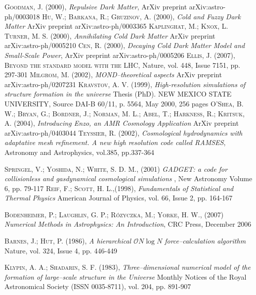 \documentclass[a4paper,openright,12pt]{book}
\begin{document}
\begin{thebibliography}{a}
 
 \textsc{Goodman, J. (2000)},
\textit{Repulsive Dark Matter},
ArXiv preprint arXiv:astro-ph/0003018
 \textsc{Hu, W.; Barkana, R.; Gruzinov, A. (2000)},
\textit{Cold and Fuzzy Dark Matter}
ArXiv preprint arXiv:astro-ph/0003365
 \textsc{Kaplinghat, M.; Knox, L. Turner, M. S. (2000)},
\textit{Annihilating Cold Dark Matter}
ArXiv preprint arXiv:astro-ph/0005210
 \textsc{Cen, R. (2000)},
\textit{Decaying Cold Dark Matter Model and Small-Scale Power},
ArXiv preprint arXiv:astro-ph/0005206
 \textsc{Ellis, J. (2007)},
\textsc{Beyond the standard model with the LHC},
Nature, vol. 448, Issue 7151, pp. 297-301
 \textsc{Milgrom, M. (2002)},
\textit{MOND--theoretical aspects}
ArXiv preprint arXiv:astro-ph/0207231
 \textsc{Kravstov, A. V. (1999)},
\textit{High-resolution simulations of structure formation in the universe}
Thesis (PhD). NEW MEXICO STATE UNIVERSITY, Source DAI-B 60/11, p. 5564, May 2000, 256 pages
 \textsc{O'Shea, B. W.; Bryan, G.; Bordner, J.; Norman, M. L.; Abel, T.; Harkness, R.; Kritsuk, A. (2004)},
\textit{Introducing Enzo, an AMR Cosmology Application}
ArXiv preprint arXiv:astro-ph/0403044
 \textsc{Teyssier, R. (2002)},
\textit{Cosmological hydrodynamics with adaptative mesh refinement. A new high resolution code called RAMSES},
Astronomy and Astrophysics, vol.385, pp.337-364

 \textsc{Springel, V.; Yoshida, N.; White, S. D. M., (2001)}
\textit{GADGET: a code for collisionless and gasdynamical cosmological simulations },
New Astronomy Volume 6, pp. 79-117
 \textsc{Reif, F.; Scott, H. L.,(1998)},
\textit{Fundamentals of Statistical and Thermal Physics}
American Journal of Physics, vol. 66, Issue 2, pp. 164-167

 \textsc{Bodenheimer, P.; Laughlin, G. P.; Rózyczka, M.; Yorke, H. W., (2007)} 
\textit{Numerical Methods in Astrophysics: An Introduction},
CRC Press, December 2006

 \textsc{Barnes, J.; Hut, P. (1986)},
\textit{A hierarchical $\mathcal{O}N\log N$ force--calculation algorithm}
Nature, vol. 324, Issue 4, pp. 446-449

 \textsc{Klypin, A. A.; Shadarin, S. F. (1983)},
\textit{Three--dimensional numerical model of the formation of large--scale structure in the Universe}
Monthly Notices of the Royal Astronomical Society (ISSN 0035-8711), vol. 204, pp. 891-907


\end{thebibliography}
\end{document}
